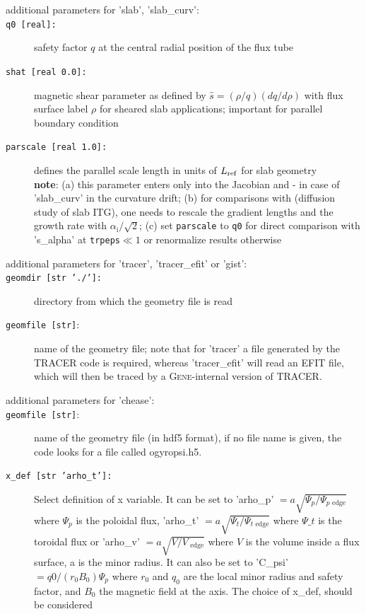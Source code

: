 \documentclass[12pt]{article}
\begin{document}
\begin{description}
\item[additional parameters for 'slab', 'slab\_curv':]
\item[\hypertarget{q0}{\texttt{q0 [real]:}}] safety factor $q$ at the central radial position of the flux tube
\item[\texttt{shat [real 0.0]:}] magnetic shear parameter as defined by $\hat s=(\rho/q)(dq/d\rho)$ with flux surface label $\rho$ 
for sheared slab applications; important for parallel boundary condition
\item[\texttt{parscale [real 1.0]:}] defines the parallel scale length
in units of $L_{\rm ref}$ for slab geometry\\
\textbf{note}: (a) this parameter enters only into the Jacobian and - in case of 'slab\_curv' in the curvature drift; (b) for
comparisons with \cite{diffusion} (diffusion study of slab ITG), one needs to
rescale the gradient lengths and the growth rate with $\alpha_\mathrm{i} / \sqrt{2}$;
(c) set {\tt parscale} to {\tt q0} for direct comparison with 's\_alpha' at {\tt trpeps}$\ll 1$ or renormalize results otherwise
%
\item[additional parameters for 'tracer', 'tracer\_efit' or 'gist':]
\item[\texttt{geomdir [str './']:}] directory from which the geometry file is read
\item[\texttt{geomfile [str]}:] name of the geometry file; note that for 'tracer' a file generated by
the TRACER code is required, whereas 'tracer\_efit' will read an EFIT file, which will then be traced
by a \textsc{Gene}-internal version of TRACER.
\item[additional parameters for 'chease':]
\item[\texttt{geomfile [str]}:] name of the geometry file (in hdf5 format), if
  no file name is given, the code looks for a file called ogyropsi.h5.
\item[\texttt{x\_def [str 'arho\_t']:}] Select definition of x variable.  It can be
  set to 'arho\_p' $=a \sqrt{\Psi_p / \Psi_{p\mbox{ edge}}}$ where $\Psi_p$ is the
  poloidal flux, 'arho\_t' $=a \sqrt{\Psi_t / \Psi_{t\mbox{ edge}}}$ where $\Psi\_t$ is the
  toroidal flux or 'arho\_v' $=a \sqrt{V / V_{\mbox{ edge}}}$ where $V$ is the
  volume inside a flux surface, a is the minor radius. It can also be set to 'C\_psi'
  $=q0/(r_0 B_0) \Psi_p$ where $r_0$ and $q_0$ are the local minor radius and
  safety factor, and $B_0$ the magnetic field at the axis. The choice of x\_def, should be considered

\end{description}
\end{document}
